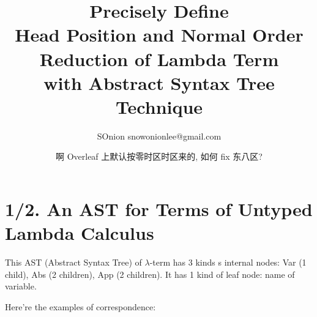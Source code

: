 \documentclass[]{article}
\title{Precisely Define \\ Head Position and Normal Order Reduction of Lambda Term \\ with Abstract Syntax Tree Technique}
\author{SOnion snowonionlee@gmail.com}
\date{\DTMnow 啊 Overleaf 上默认按零时区时区来的, 如何 fix 东八区?}
\def\l{\lambda}
\begin{document}
\maketitle

\section{1/2. An AST for Terms of Untyped Lambda Calculus}

This AST (Abstract Syntax Tree) of $\l$-term has 3 kinds s internal nodes: Var (1 child), Abs (2 children), App (2 children). It has 1 kind of leaf node: name of variable.

Here're the examples of correspondence:

\newcommand\ltree[1]{ %
	\ifthenelse{#1 = 1}{
		\begin{forest}
			[Abs
				[Var[$ x $]]
				[Abs[$ y $][$ M $]]
			]
		\end{forest}
	}{
		\ifthenelse{#1 = 2}{
			\begin{forest}
				[App
					[App[$ M $][$ N $]]
					[$ P $]
				]
			\end{forest}
		}{
			\ifthenelse{#1 = 3}{
				\begin{forest}
					[App
						[Var[$ x $]]
						[App[$ M $][$ N $]]
					]
				\end{forest}
			}{
				\ifthenelse{#1 = 4}{
					\begin{forest}
						[App
							[Abs[Var[$ x $]][$ M $]]
							[$ N $]
						]
					\end{forest}
				}{
					ERROR in document source file!	
				}		
			}
		}
	}
}

\renewcommand\theadalign{bc}
\renewcommand\theadfont{\bfseries}
\renewcommand\theadgape{\Gape[4pt]}
\renewcommand\cellgape{\Gape[4pt]}
\end{document}
